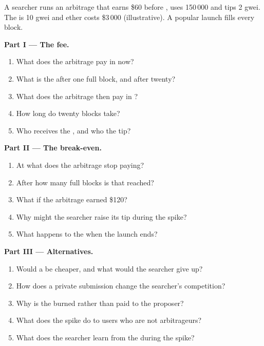 \begin{problem}\label{pb:m3:blockchains-for-traders:1}
A searcher runs an arbitrage that earns \$60 before , uses 150\,000  and tips 2 gwei. The  is 10 gwei and
ether costs \$3\,000 (illustrative). A popular  launch fills every block.

\medskip\noindent\textbf{Part I --- The fee.}
\begin{enumerate}
\item What does the arbitrage pay in  now?
\item What is the  after one full block, and after twenty?
\item What does the arbitrage then pay in ?
\item How long do twenty blocks take?
\item Who receives the , and who the tip?
\end{enumerate}

\medskip\noindent\textbf{Part II --- The break-even.}
\begin{enumerate}[resume]
\item At what  does the arbitrage stop paying?
\item After how many full blocks is that reached?
\item What if the arbitrage earned \$120?
\item Why might the searcher raise its tip during the spike?
\item What happens to the  when the launch ends?
\end{enumerate}

\medskip\noindent\textbf{Part III --- Alternatives.}
\begin{enumerate}[resume]
\item Would a  be cheaper, and what would the searcher give up?
\item How does a private submission change the searcher's competition?
\item Why is the  burned rather than paid to the proposer?
\item What does the spike do to users who are not arbitrageurs?
\item What does the searcher learn from the  during the spike?
\end{enumerate}


\end{problem}
